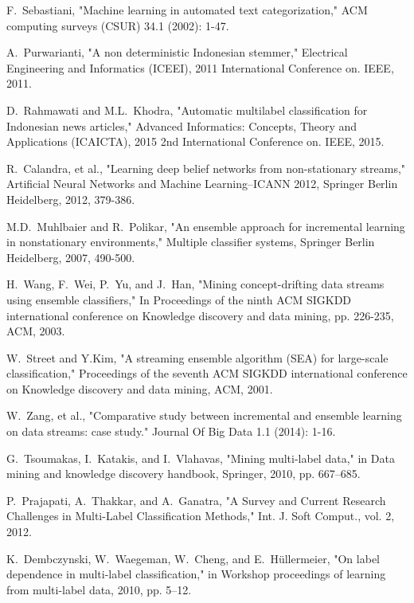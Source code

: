 \documentclass[conference]{IEEEtran}
\begin{document}
\begin{thebibliography}{1}

F.~Sebastiani,
    "Machine learning in automated text categorization,"
    ACM computing surveys (CSUR) 34.1 (2002): 1-47.

A.~Purwarianti,
    "A non deterministic Indonesian stemmer,"
    Electrical Engineering and Informatics (ICEEI),
    2011 International Conference on. IEEE, 2011.

D.~Rahmawati and M.L.~Khodra,
    "Automatic multilabel classification for Indonesian news articles,"
    Advanced Informatics: Concepts, Theory and Applications (ICAICTA),
    2015 2nd International Conference on. IEEE, 2015.

R.~Calandra, et al.,
    "Learning deep belief networks from non-stationary streams,"
    Artificial Neural Networks and Machine Learning–ICANN 2012,
    Springer Berlin Heidelberg, 2012, 379-386.

M.D.~Muhlbaier and R.~Polikar,
    "An ensemble approach for incremental learning in nonstationary environments,"
    Multiple classifier systems, Springer Berlin Heidelberg, 2007, 490-500.

H.~Wang, F.~Wei, P.~Yu, and J.~Han,
    "Mining concept-drifting data streams using ensemble classifiers,"
    In Proceedings of the ninth ACM SIGKDD international conference on Knowledge discovery and data mining,
    pp. 226-235, ACM, 2003.
    
W.~Street and Y.Kim,
    "A streaming ensemble algorithm (SEA) for large-scale classification," 
    Proceedings of the seventh ACM SIGKDD international conference on Knowledge discovery and data mining,
    ACM, 2001.

W.~Zang, et al.,
    "Comparative study between incremental and ensemble learning on data streams: case study."
    Journal Of Big Data 1.1 (2014): 1-16.

G.~Tsoumakas, I.~Katakis, and I.~Vlahavas,
    "Mining multi-label data,"
    in Data mining and knowledge discovery handbook,
    Springer, 2010, pp. 667–685.

P.~Prajapati, A.~Thakkar, and A.~Ganatra,
    "A Survey and Current Research Challenges in Multi-Label Classification Methods,"
    Int. J. Soft Comput., vol. 2, 2012.

K.~Dembczynski, W.~Waegeman, W.~Cheng, and E.~Hüllermeier,
    "On label dependence in multi-label classification,"
    in Workshop proceedings of learning from multi-label data,
    2010, pp. 5–12.


\end{thebibliography}
\end{document}
